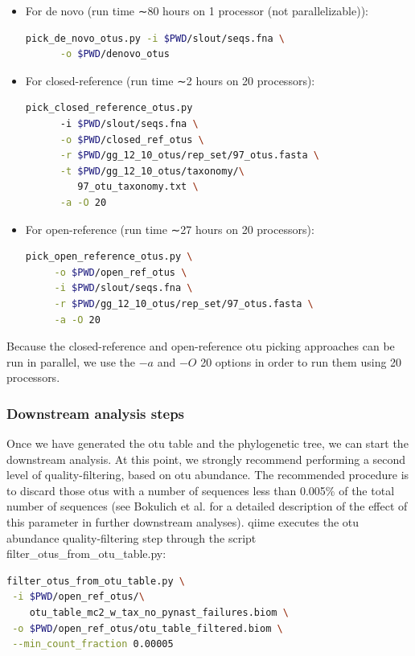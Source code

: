 \begin{itemize}
    \item For de novo (run time ∼80 hours on 1 processor (not parallelizable)):
    \begin{lstlisting}[language=bash]
    pick_de_novo_otus.py -i $PWD/slout/seqs.fna \
      -o $PWD/denovo_otus
    \end{lstlisting}
    \item For closed-reference (run time ∼2 hours on 20 processors):
    \begin{lstlisting}[language=bash]
    pick_closed_reference_otus.py
      -i $PWD/slout/seqs.fna \
      -o $PWD/closed_ref_otus \
      -r $PWD/gg_12_10_otus/rep_set/97_otus.fasta \
      -t $PWD/gg_12_10_otus/taxonomy/\
         97_otu_taxonomy.txt \
      -a -O 20
    \end{lstlisting}
    \item For open-reference (run time ∼27 hours on 20 processors):
    \begin{lstlisting}[language=bash]
    pick_open_reference_otus.py \
     -o $PWD/open_ref_otus \
     -i $PWD/slout/seqs.fna \
     -r $PWD/gg_12_10_otus/rep_set/97_otus.fasta \
     -a -O 20
    \end{lstlisting}
\end{itemize}


Because the closed-reference and open-reference \gls{otu} picking approaches can
be run in parallel, we use the $-a$ and $-O$ 20 options in order to run them using
20 processors.

\subsubsection{Downstream analysis steps}

Once we have generated the \gls{otu} table and the phylogenetic tree, we can start the
downstream analysis. At this point, we strongly recommend performing a second level
of quality-filtering, based on \gls{otu} abundance. The recommended procedure is to
discard those \gls{otu}s with a number of sequences less than 0.005\% of the total
number of sequences (see Bokulich et al. \cite{Bokulich2013} for a detailed description
of the effect of this parameter in further downstream analyses). \gls{qiime} executes the
\gls{otu} abundance quality-filtering step through the script filter\_otus\_from\_otu\_table.py:

\begin{lstlisting}[language=bash]
filter_otus_from_otu_table.py \
 -i $PWD/open_ref_otus/\
    otu_table_mc2_w_tax_no_pynast_failures.biom \
 -o $PWD/open_ref_otus/otu_table_filtered.biom \
 --min_count_fraction 0.00005
\end{lstlisting}

